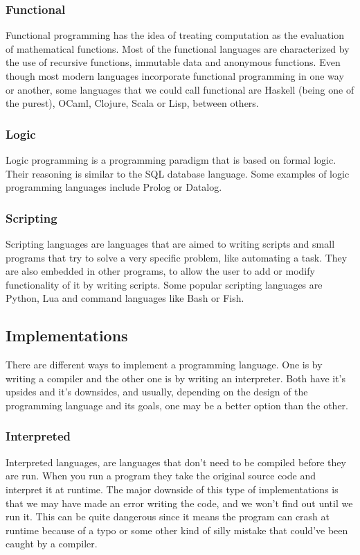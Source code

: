 ﻿\documentclass[10pt,a4paper,twocolumn,twoside]{article}
\begin{document}
\subsubsection{Functional}
Functional programming has the idea of treating computation as the evaluation of
mathematical functions. Most of the functional languages are characterized by
the use of recursive functions, immutable data and anonymous functions. Even
though most modern languages incorporate functional programming in one way or
another, some languages that we could call functional are Haskell (being one of
the purest), OCaml, Clojure, Scala or Lisp, between others.

\subsubsection{Logic}
Logic programming is a programming paradigm that is based on formal logic. Their
reasoning is similar to the SQL database language. Some examples of logic
programming languages include Prolog or Datalog.

\subsubsection{Scripting}
Scripting languages are languages that are aimed to writing scripts and small
programs that try to solve a very specific problem, like automating a task. They
are also embedded in other programs, to allow the user to add or modify
functionality of it by writing scripts. Some popular scripting languages are 
Python, Lua and command languages like Bash or Fish.

\subsection{Implementations}
There are different ways to implement a programming language. One is by writing
a compiler and the other one is by writing an interpreter. Both have it's
upsides and it's downsides, and usually, depending on the design of the
programming language and its goals, one may be a better option than the other.

\subsubsection{Interpreted}
Interpreted languages, are languages that don't need to be compiled before they
are run. When you run a program they take the original source code and interpret
it at runtime. The major downside of this type of implementations is that we may
have made an error writing the code, and we won't find out until we run it. This
can be quite dangerous since it means the program can crash at runtime because
of a typo or some other kind of silly mistake that could've been caught by a
compiler.
\end{document}
